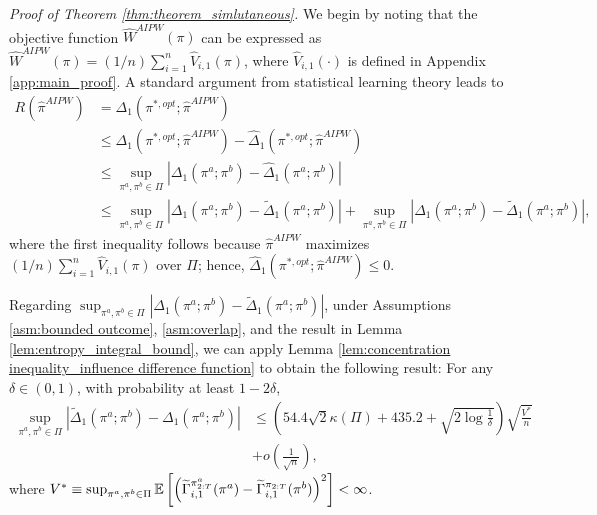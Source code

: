 \noindent
\textit{Proof of Theorem \ref{thm:theorem_simlutaneous}.}
We begin by noting that the objective function $\widehat{W}^{AIPW}(\pi)$ can be expressed as $\widehat{W}^{AIPW}(\pi) = (1/n)\sum_{i=1}^{n}\widehat{V}_{i,1}(\pi)$, where $\widehat{V}_{i,1}(\cdot)$ is defined in Appendix \ref{app:main_proof}. A standard argument from statistical learning theory \cite[e.g.,][]{Lugosi_2002} leads to
\begin{align}
    R(\hat{\pi}^{AIPW})  &=\Delta_{1}\left(\pi^{\ast,opt};\hat{\pi}^{AIPW}\right) 
    \nonumber\\
    &\leq \Delta_{1}\left(\pi^{\ast,opt};\hat{\pi}^{AIPW}\right) - \widehat{\Delta}_{1}\left(\pi^{\ast,opt};\hat{\pi}^{AIPW}\right) \nonumber \\
    &\leq 
    \sup_{\pi^{a},\pi^{b} \in \Pi} |\Delta_{1}(\pi^{a};\pi^{b}) - \widehat{\Delta}_{1}(\pi^{a};\pi^{b})| \nonumber \\
    & \leq   \sup_{\pi^{a},\pi^{b} \in \Pi}|\Delta_{1}(\pi^{a};\pi^{b}) - \widetilde{\Delta}_{1}(\pi^{a};\pi^{b})| 
       + \sup_{\pi^{a},\pi^{b} \in \Pi} |\widehat{\Delta}_{1}(\pi^{a};\pi^{b}) - \widetilde{\Delta}_{1}(\pi^{a};\pi^{b})|, \label{eq:basic_bound_AIPW}
\end{align}
where the first inequality follows because $\hat{\pi}^{AIPW}$ maximizes $(1/n)\sum_{i=1}^{n}\widehat{V}_{i,1}(\pi)$ over $\Pi$; hence, $\widehat{\Delta}_{1}\left(\pi^{\ast,opt};\hat{\pi}^{AIPW}\right) \leq 0$.

Regarding $\sup_{\pi^{a},\pi^{b} \in \Pi}|\Delta_{1}(\pi^{a};\pi^{b}) - \widetilde{\Delta}_{1}(\pi^{a};\pi^{b})|$, under Assumptions \ref{asm:bounded outcome}, \ref{asm:overlap}, and the result in Lemma \ref{lem:entropy_integral_bound}, we can apply Lemma \ref{lem:concentration inequality_influence difference function} to obtain the following result: 
For any $\delta \in (0,1)$, with probability at least $1-2\delta$,
\begin{align}
    \sup_{\pi^{a},\pi^{b} \in \Pi} 
  |\widetilde{\Delta}_{1}(\pi^{a};\pi^{b})  - \Delta_{1}(\pi^{a};\pi^{b})| 
    &\leq \left(54.4 \sqrt{2}\kappa(\Pi) + 435.2 + \sqrt{2 \log \frac{1}{\delta}}\right)\sqrt{\frac{V^{\ast}}{n}} \nonumber \\
    &+ o\left(\frac{1}{\sqrt{n}}\right), \label{eq:bound_influence_difference_function_AIPW}
\end{align}
where $V^{\ast}  \equiv  \sup_{\pi^{a},\pi^{b} \in \Pi}\mathbb{E}
    \left[\left(\widetilde{\Gamma}_{i,1}^{\pi_{2:T}^{a}}(\pi^{a}) - \widetilde{\Gamma}_{i,1}^{\pi_{2:T}}(\pi^{b}) \right)^2\right] < \infty$.

